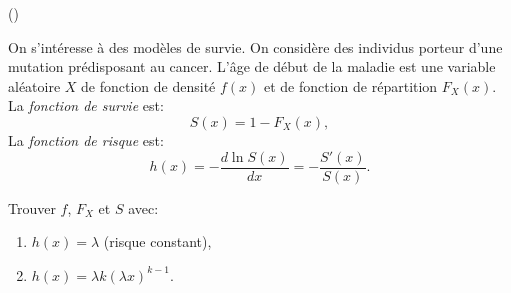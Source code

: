 \begin{exercice}\label{exo4-13} (\coolexo)

On s'int\'eresse \`a des mod\`eles de survie.
On consid\`ere des individus porteur d'une mutation pr\'edisposant au cancer. L'\^age de d\'ebut de la maladie est une variable al\'eatoire $X$ de fonction de densit\'e $f(x)$ et de fonction de r\'epartition $F_X(x)$.
La \emph{fonction de survie} est:
\[
S(x) = 1 - F_X(x),
\]
La \emph{fonction de risque} est:
\[
h(x) = - \frac{d \ln S(x)}{dx} = - \frac{S'(x)}{S(x)}.
\]

Trouver $f$, $F_X$ et $S$ avec:
\begin{enumerate}

\item $h(x) = \lambda$ (risque constant),

\item $h(x) = \lambda k (\lambda x)^{k-1}$.

\end{enumerate}


\end{exercice}
